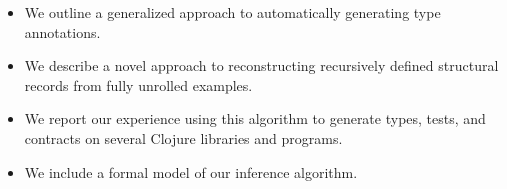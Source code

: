 
%
%
%



\begin{itemize}
\item We outline a generalized approach to automatically
    generating type annotations.
\item
  We describe a novel approach to reconstructing recursively
  defined structural records from fully unrolled examples.
\item
  We report our experience using this algorithm to generate
  types, tests, and contracts on several
  Clojure libraries and programs.
\item
  We include a formal model of our inference algorithm.
\end{itemize}
